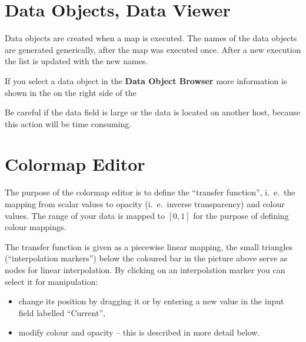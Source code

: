 	 \section{Data Objects, Data Viewer}
	 \label{data:viewer}

	 Data objects are created when a map is executed. The names of the data 
	 objects are generated generically, after the map was executed once. After a 
	 new execution the list is updated with the new names. 
    
    If you select a data object in the {\bf Data Object Browser}  more information is shown in the {\mydataviewer}
    on the right side of the {\mapeditor} 

	 

	 Be careful if the data field is large or the data is located on another host, 
	 because this action will be time consuming.  


	 \section{Colormap Editor}
    \label{colormap}


         The purpose of the colormap editor is to define the ``transfer
         function'', i.~e.\ the mapping from scalar values to opacity
         (i.~e.\ inverse transparency) and colour values.
         The range of your data is mapped to $[0, 1]$ for the purpose of
         defining colour mappings.

         The transfer function is given as a piecewise linear mapping,
         the small triangles (``interpolation markers'') below the coloured bar
         in the picture above serve as nodes for linear interpolation.
         By clicking on an interpolation marker you can select it for
         manipulation:
         \begin{itemize}
         \item change its position by dragging it or by entering a new
         value in the input field labelled ``Current'', 
         \item modify colour and opacity -- this is described in
         more detail below.
         \end{itemize}

